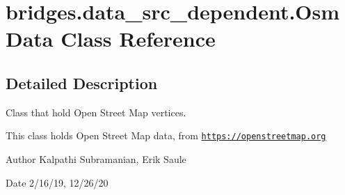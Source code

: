 \hypertarget{classbridges_1_1data__src__dependent_1_1_osm_data}{}\section{bridges.\+data\+\_\+src\+\_\+dependent.\+Osm\+Data Class Reference}
\label{classbridges_1_1data__src__dependent_1_1_osm_data}


\subsection{Detailed Description}
Class that hold Open Street Map vertices. 

This class holds Open Street Map data, from \href{https://openstreetmap.org}{\tt https\+://openstreetmap.\+org}

\begin{DoxyAuthor}{Author}
Kalpathi Subramanian, Erik Saule
\end{DoxyAuthor}
\begin{DoxyDate}{Date}
2/16/19, 12/26/20 
\end{DoxyDate}
